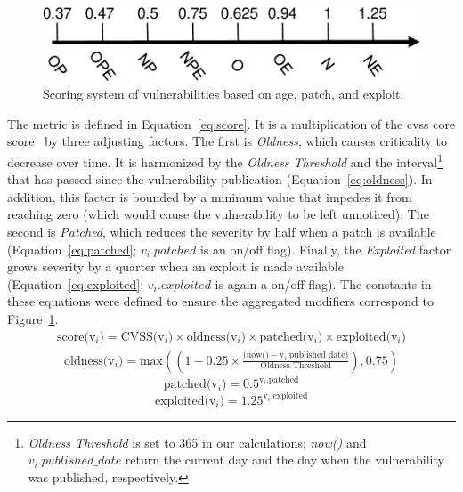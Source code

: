 \begin{figure}[!t]
\begin{center}
\includegraphics[width=0.7\columnwidth]{images/images/scale.pdf}
\caption{Scoring system of vulnerabilities based on age, patch, and exploit.}
\label{fig:scale}
\end{center}
\end{figure}


The metric is defined in Equation~\ref{eq:score}.
It is a multiplication of the \gls{cvss} core score~\cite{cvssv3} by three adjusting factors. 
The first is \emph{Oldness}, which causes criticality to decrease over time. 
It is harmonized by the \emph{Oldness Threshold} and the interval\footnote{\textit{Oldness Threshold} is set to 365 in our calculations; \textit{now()} and $v_i.published\_date$ return the current day and the day when the vulnerability was published, respectively.} that has passed since the vulnerability publication (Equation~\ref{eq:oldness}). 
In addition, this factor is bounded by a minimum value that impedes it from reaching zero (which would cause the vulnerability to be left unnoticed).
The second is \emph{Patched}, which reduces the severity by half when a patch is available (Equation~\ref{eq:patched}; $v_{i}.patched$ is an on/off flag).
Finally, the \emph{Exploited} factor grows severity by a quarter when an exploit is made available (Equation~\ref{eq:exploited}; $v_{i}.exploited$ is again a on/off flag).
The constants in these equations were defined to ensure the aggregated modifiers correspond to Figure~\ref{fig:scale}.
\begin{equation}
\begin{split}
\text{score(v$_i$)}=\text{CVSS(v$_i$)}\times\text{oldness(v$_i$)}\times\text{patched(v$_i$)}\times\text{exploited(v$_i$)}
\label{eq:score}
\end{split}
\end{equation}
\begin{equation} 
\begin{split}
\text{oldness(v$_i$)}=\text{max}\left((1-0.25\times\frac{(\text{now()}-\text{v$_i$.published\_date)}}{\text{Oldness Threshold}}), 0.75\right)
\label{eq:oldness}
\end{split}
\end{equation}
\begin{equation} 
\text{patched(v$_i$)}=0.5^{\text{v$_i$.patched}}
\label{eq:patched}
\end{equation} 
\begin{equation}
\text{exploited(v$_i$)} = 1.25^{\text{v$_i$.exploited}}
\label{eq:exploited}
\end{equation}  


